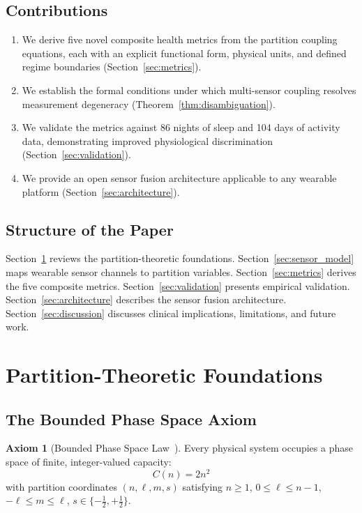 \documentclass[10pt,twocolumn,a4paper]{article}
\theoremstyle{definition}
\newtheorem{axiom}{Axiom}
\begin{document}
\subsection{Contributions}

\begin{enumerate}[leftmargin=*]
\item We derive five novel composite health metrics from the partition
  coupling equations, each with an explicit functional form, physical
  units, and defined regime boundaries (Section~\ref{sec:metrics}).
\item We establish the formal conditions under which multi-sensor
  coupling resolves measurement degeneracy
  (Theorem~\ref{thm:disambiguation}).
\item We validate the metrics against 86 nights of sleep and 104 days
  of activity data, demonstrating improved physiological discrimination
  (Section~\ref{sec:validation}).
\item We provide an open sensor fusion architecture applicable to any
  wearable platform (Section~\ref{sec:architecture}).
\end{enumerate}

\subsection{Structure of the Paper}

Section~\ref{sec:framework} reviews the partition-theoretic foundations.
Section~\ref{sec:sensor_model} maps wearable sensor channels to
partition variables. Section~\ref{sec:metrics} derives the five
composite metrics. Section~\ref{sec:validation} presents empirical
validation. Section~\ref{sec:architecture} describes the sensor fusion
architecture. Section~\ref{sec:discussion} discusses clinical
implications, limitations, and future work.

\section{Partition-Theoretic Foundations}
\label{sec:framework}

\subsection{The Bounded Phase Space Axiom}

\begin{axiom}[Bounded Phase Space Law~\cite{sachikonye2024integration}]
\label{ax:bpsl}
Every physical system occupies a phase space of finite, integer-valued
capacity:
\begin{equation}
\boxed{C(n) = 2n^2}
\end{equation}
with partition coordinates $(n, \ell, m, s)$ satisfying
$n \geq 1$, $0 \leq \ell \leq n-1$, $-\ell \leq m \leq \ell$,
$s \in \{-\tfrac{1}{2}, +\tfrac{1}{2}\}$.
\end{axiom}
\end{document}
